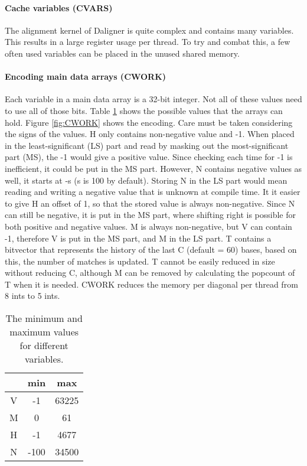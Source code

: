 \documentclass[../main/thesis.tex]{subfiles}
\begin{document}
\paragraph{Cache variables (CVARS)}
The alignment kernel of Daligner is quite complex and contains many variables.
This results in a large register usage per thread.
To try and combat this, a few often used variables can be placed in the unused shared memory.

\paragraph{Encoding main data arrays (CWORK)}
Each variable in a main data array is a 32-bit integer.
Not all of these values need to use all of those bits.
Table \ref{tbl:value_range} shows the possible values that the arrays can hold.
Figure \ref{fig:CWORK} shows the encoding.
Care must be taken considering the signs of the values.
H only contains non-negative value and -1.
When placed in the least-significant (LS) part and read by masking out the most-significant part (MS), the -1 would give a positive value.
Since checking each time for -1 is inefficient, it could be put in the MS part.
However, N contains negative values as well, it starts at -s (s is 100 by default).
Storing N in the LS part would mean reading and writing a negative value that is unknown at compile time.
It it easier to give H an offset of 1, so that the stored value is always non-negative.
Since N can still be negative, it is put in the MS part, where shifting right is possible for both positive and negative values.
M is always non-negative, but V can contain -1, therefore V is put in the MS part, and M in the LS part.
T contains a bitvector that represents the history of the last C (default = 60) bases, based on this, the number of matches is updated.
T cannot be easily reduced in size without reducing C, although M can be removed by calculating the popcount of T when it is needed.
CWORK reduces the memory per diagonal per thread from 8 ints to 5 ints.

\begin{table}
\caption{The minimum and maximum values for different variables.}
\label{tbl:value_range}
\centering
\begin{tabular}{c|c c}
& min & max \\ \hline
V & -1 & 63225 \\
M & 0 & 61 \\
H & -1 & 4677 \\
N & -100 & 34500 \\
\end{tabular}
\end{table}
\end{document}
